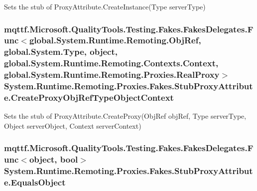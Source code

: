 Sets the stub of Proxy\-Attribute.\-Create\-Instance(\-Type server\-Type)

\hypertarget{class_system_1_1_runtime_1_1_remoting_1_1_proxies_1_1_fakes_1_1_stub_proxy_attribute_a5efd073f9fdb442d3a54d7ef8a185d4a}{
\subsubsection[{Create\-Proxy\-Obj\-Ref\-Type\-Object\-Context}]{\setlength{\rightskip}{0pt plus 5cm}mqttf.\-Microsoft.\-Quality\-Tools.\-Testing.\-Fakes.\-Fakes\-Delegates.\-Func$<$global.\-System.\-Runtime.\-Remoting.\-Obj\-Ref, global.\-System.\-Type, object, global.\-System.\-Runtime.\-Remoting.\-Contexts.\-Context, global.\-System.\-Runtime.\-Remoting.\-Proxies.\-Real\-Proxy$>$ System.\-Runtime.\-Remoting.\-Proxies.\-Fakes.\-Stub\-Proxy\-Attribute.\-Create\-Proxy\-Obj\-Ref\-Type\-Object\-Context}}\label{class_system_1_1_runtime_1_1_remoting_1_1_proxies_1_1_fakes_1_1_stub_proxy_attribute_a5efd073f9fdb442d3a54d7ef8a185d4a}


Sets the stub of Proxy\-Attribute.\-Create\-Proxy(\-Obj\-Ref obj\-Ref, Type server\-Type, Object server\-Object, Context server\-Context)

\hypertarget{class_system_1_1_runtime_1_1_remoting_1_1_proxies_1_1_fakes_1_1_stub_proxy_attribute_afd06137cdb5e18ea50458796830a48ee}{
\subsubsection[{Equals\-Object}]{\setlength{\rightskip}{0pt plus 5cm}mqttf.\-Microsoft.\-Quality\-Tools.\-Testing.\-Fakes.\-Fakes\-Delegates.\-Func$<$object, bool$>$ System.\-Runtime.\-Remoting.\-Proxies.\-Fakes.\-Stub\-Proxy\-Attribute.\-Equals\-Object}}\label{class_system_1_1_runtime_1_1_remoting_1_1_proxies_1_1_fakes_1_1_stub_proxy_attribute_afd06137cdb5e18ea50458796830a48ee}


